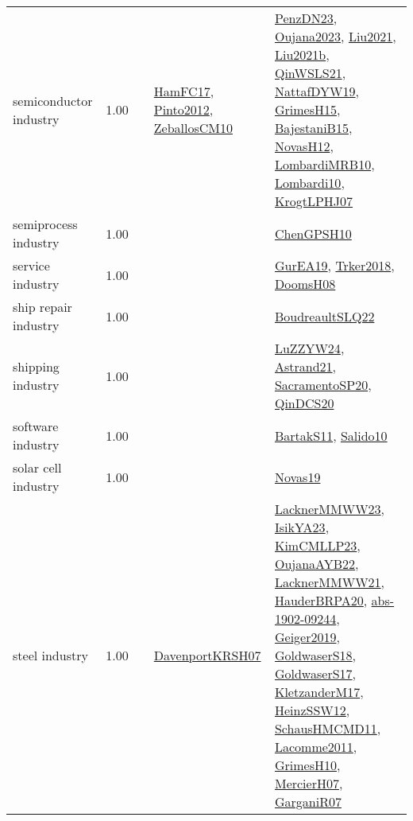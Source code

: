 {\begin{longtable}{p{3cm}r>{\raggedright\arraybackslash}p{6cm}>{\raggedright\arraybackslash}p{6cm}>{\raggedright\arraybackslash}p{8cm}}
\index{semiconductor industry}\index{Industries!semiconductor industry}semiconductor industry &  1.00 &  & \hyperref[detail:HamFC17]{HamFC17}, \hyperref[detail:Pinto2012]{Pinto2012}, \hyperref[detail:ZeballosCM10]{ZeballosCM10} & \hyperref[detail:PenzDN23]{PenzDN23}, \hyperref[detail:Oujana2023]{Oujana2023}, \hyperref[detail:Liu2021]{Liu2021}, \hyperref[detail:Liu2021b]{Liu2021b}, \hyperref[detail:QinWSLS21]{QinWSLS21}, \hyperref[detail:NattafDYW19]{NattafDYW19}, \hyperref[detail:GrimesH15]{GrimesH15}, \hyperref[detail:BajestaniB15]{BajestaniB15}, \hyperref[detail:NovasH12]{NovasH12}, \hyperref[detail:LombardiMRB10]{LombardiMRB10}, \hyperref[detail:Lombardi10]{Lombardi10}, \hyperref[detail:KrogtLPHJ07]{KrogtLPHJ07}\\
\index{semiprocess industry}\index{Industries!semiprocess industry}semiprocess industry &  1.00 &  &  & \hyperref[detail:ChenGPSH10]{ChenGPSH10}\\
\index{service industry}\index{Industries!service industry}service industry &  1.00 &  &  & \hyperref[detail:GurEA19]{GurEA19}, \hyperref[detail:Trker2018]{Trker2018}, \hyperref[detail:DoomsH08]{DoomsH08}\\
\index{ship repair industry}\index{Industries!ship repair industry}ship repair industry &  1.00 &  &  & \hyperref[detail:BoudreaultSLQ22]{BoudreaultSLQ22}\\
\index{shipping industry}\index{Industries!shipping industry}shipping industry &  1.00 &  &  & \hyperref[detail:LuZZYW24]{LuZZYW24}, \hyperref[detail:Astrand21]{Astrand21}, \hyperref[detail:SacramentoSP20]{SacramentoSP20}, \hyperref[detail:QinDCS20]{QinDCS20}\\
\index{software industry}\index{Industries!software industry}software industry &  1.00 &  &  & \hyperref[detail:BartakS11]{BartakS11}, \hyperref[detail:Salido10]{Salido10}\\
\index{solar cell industry}\index{Industries!solar cell industry}solar cell industry &  1.00 &  &  & \hyperref[detail:Novas19]{Novas19}\\
\index{steel industry}\index{Industries!steel industry}steel industry &  1.00 &  & \hyperref[detail:DavenportKRSH07]{DavenportKRSH07} & \hyperref[detail:LacknerMMWW23]{LacknerMMWW23}, \hyperref[detail:IsikYA23]{IsikYA23}, \hyperref[detail:KimCMLLP23]{KimCMLLP23}, \hyperref[detail:OujanaAYB22]{OujanaAYB22}, \hyperref[detail:LacknerMMWW21]{LacknerMMWW21}, \hyperref[detail:HauderBRPA20]{HauderBRPA20}, \hyperref[detail:abs-1902-09244]{abs-1902-09244}, \hyperref[detail:Geiger2019]{Geiger2019}, \hyperref[detail:GoldwaserS18]{GoldwaserS18}, \hyperref[detail:GoldwaserS17]{GoldwaserS17}, \hyperref[detail:KletzanderM17]{KletzanderM17}, \hyperref[detail:HeinzSSW12]{HeinzSSW12}, \hyperref[detail:SchausHMCMD11]{SchausHMCMD11}, \hyperref[detail:Lacomme2011]{Lacomme2011}, \hyperref[detail:GrimesH10]{GrimesH10}, \hyperref[detail:MercierH07]{MercierH07}, \hyperref[detail:GarganiR07]{GarganiR07}\\

\end{longtable}}
